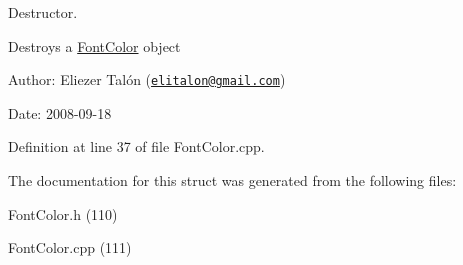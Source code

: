 Destructor. 

Destroys a \hyperlink{struct_font_color}{FontColor} object

\begin{Desc}
\item[Author:]Eliezer Talón (\href{mailto:elitalon@gmail.com}{\tt elitalon@gmail.com}) \end{Desc}
\begin{Desc}
\item[Date:]2008-09-18 \end{Desc}


Definition at line 37 of file FontColor.cpp.

The documentation for this struct was generated from the following files:\begin{CompactItemize}
\item 
FontColor.h (110)\item 
FontColor.cpp (111)\end{CompactItemize}
